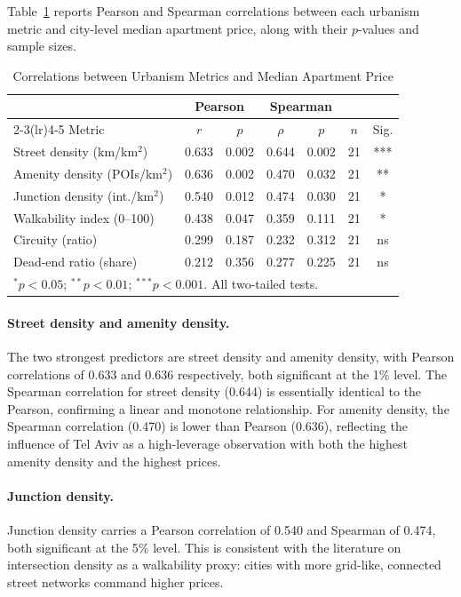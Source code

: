 \documentclass[12pt,a4paper]{article}
\begin{document}
Table~\ref{tab:corr} reports Pearson and Spearman correlations between each
urbanism metric and city-level median apartment price, along with their
$p$-values and sample sizes.

\begin{table}[H]
\centering
\caption{Correlations between Urbanism Metrics and Median Apartment Price}
\label{tab:corr}
\begin{tabular}{lcccccc}
\toprule
 & \multicolumn{2}{c}{Pearson} & \multicolumn{2}{c}{Spearman} & & \\
\cmidrule(lr){2-3}\cmidrule(lr){4-5}
Metric & $r$ & $p$ & $\rho$ & $p$ & $n$ & Sig. \\
\midrule
Street density (km/km$^2$)     & 0.633 & 0.002 & 0.644 & 0.002 & 21 & *** \\
Amenity density (POIs/km$^2$)  & 0.636 & 0.002 & 0.470 & 0.032 & 21 & **  \\
Junction density (int./km$^2$) & 0.540 & 0.012 & 0.474 & 0.030 & 21 & *   \\
Walkability index (0--100)     & 0.438 & 0.047 & 0.359 & 0.111 & 21 & *   \\
Circuity (ratio)               & 0.299 & 0.187 & 0.232 & 0.312 & 21 & ns  \\
Dead-end ratio (share)         & 0.212 & 0.356 & 0.277 & 0.225 & 21 & ns  \\
\bottomrule
\multicolumn{7}{l}{\footnotesize $^*p<0.05$; $^{**}p<0.01$; $^{***}p<0.001$. All two-tailed tests.}
\end{tabular}
\end{table}

\paragraph{Street density and amenity density.}  The two strongest predictors
are street density and amenity density, with Pearson correlations of 0.633 and
0.636 respectively, both significant at the 1\% level.  The Spearman
correlation for street density (0.644) is essentially identical to the Pearson,
confirming a linear and monotone relationship.  For amenity density, the
Spearman correlation (0.470) is lower than Pearson (0.636), reflecting the
influence of Tel Aviv as a high-leverage observation with both the highest
amenity density and the highest prices.

\paragraph{Junction density.}  Junction density carries a Pearson correlation
of 0.540 and Spearman of 0.474, both significant at the 5\% level.  This is
consistent with the literature on intersection density as a walkability proxy:
cities with more grid-like, connected street networks command higher prices.
\end{document}
